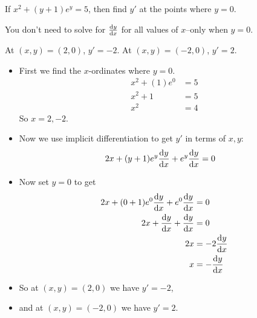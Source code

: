 \begin{question}[2015Q]If $x^2+(y+1)e^y = 5$, then find $y'$ at the points where $y=0$.
\end{question}
\begin{hint} You don't need to solve for $\diff{y}{x}$ for all values of $x$--only when $y=0$.
\end{hint}
\begin{answer} At $(x,y)=(2,0)$, $y' = -2$. At  $(x,y)=(-2,0)$,  $y' = 2$.
\end{answer}
\begin{solution}
\begin{itemize}
 \item First we find the $x$-ordinates where $y=0$.
\begin{align*}
  x^2+(1)e^0 &= 5 \\
  x^2 +1 &=5\\
  x^2&=4
\end{align*}
So $x=2,-2$.
\item Now we use implicit differentiation to get $y'$ in terms of $x,y$:
\begin{align*}
2x+(y+1)e^y\diff{y}{x}+e^y\diff{y}{x}&=0
\end{align*}
\item Now set $y=0$ to get
\begin{align*}
2x+(0+1)e^0\diff{y}{x}+e^0\diff{y}{x}&=0\\
2x+\diff{y}{x}+\diff{y}{x}&=0\\
2x&=-2\diff{y}{x}\\
x&=-\diff{y}{x}
\end{align*}
\item So at $(x,y)=(2,0)$ we have $y' = -2$,
\item and at $(x,y)=(-2,0)$ we have $y' = 2$.
\end{itemize}
\end{solution}



